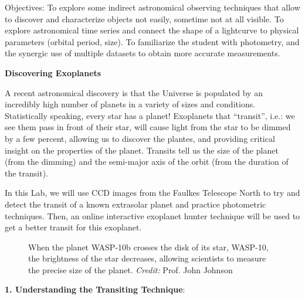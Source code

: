 
\noindent
{Objectives:} To explore some indirect astronomical observing techniques that allow to discover and characterize objects not easily, sometime not at all visible.  To explore astronomical time series and connect the shape of a lightcurve to physical parameters (orbital period, size). To familiarize the student with  photometry, and the synergic use of multiple datasets to obtain more accurate measurements.


\medskip
\bigskip
\noindent
{\bf Discovering Exoplanets}

\medskip
\noindent
A recent astronomical discovery is that the Universe is populated by
an incredibly high number of planets in a variety of sizes and
conditions. Statistically speaking, every star has a planet!
Exoplanets that ``transit'', i.e.: we see them pass in front of their
star, will cause light from the star to be dimmed by a few percent,
allowing us to discover the plantes, and providing critical insight on
the properties of the planet. Transits tell us the size of the planet
(from the dimming) and the semi-major axis of the orbit (from the
duration of the transit).

In this Lab, we will use CCD images from the Faulkes Telescope North
to try and detect the transit of a known extrasolar planet and
practice photometric techniques. Then, an online interactive exoplanet
hunter technique will be used to get a better transit for this
exoplanet.

\begin{figure*}[h]
        \centerline{}
        \caption{When the planet WASP-10b crosses the disk of its star, WASP-10, the brightness of the star decreases, allowing scientists to measure the precise size of the planet. \emph{Credit:} Prof. John Johnson}
         \end{figure*}

\noindent
{\bf 1. Understanding the Transiting Technique}:


